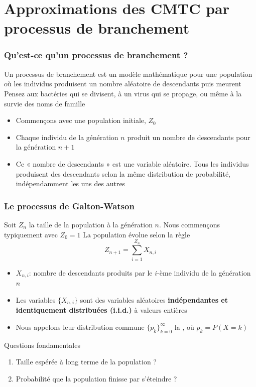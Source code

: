 \documentclass[aspectratio=169]{beamer}\usepackage[]{graphicx}\usepackage[]{xcolor}
\begin{document}
\section{Approximations des CMTC par processus de branchement}

\begin{frame}
    \frametitle{Qu'est-ce qu'un processus de branchement ?}
        Un processus de branchement est un modèle mathématique pour une population où les individus produisent un nombre aléatoire de descendants puis meurent
\vfill
Pensez aux bactéries qui se divisent, à un virus qui se propage, ou même à la survie des noms de famille
\vfill
    \begin{itemize}
        \item Commençons avec une population initiale, $Z_0$
        \item Chaque individu de la génération $n$ produit un nombre de descendants pour la génération $n+1$
        \item Ce « nombre de descendants » est une variable aléatoire. Tous les individus produisent des descendants selon la même distribution de probabilité, indépendamment les uns des autres
    \end{itemize}
\end{frame}

\begin{frame}
    \frametitle{Le processus de Galton-Watson}
    Soit $Z_n$ la taille de la population à la génération $n$. Nous commençons typiquement avec $Z_0 = 1$
\vfill
    La population évolue selon la règle
    $$ Z_{n+1} = \sum_{i=1}^{Z_n} X_{n,i} $$
\vfill
    \begin{itemize}
        \item $X_{n,i}$: nombre de descendants produits par le $i$-ème individu de la génération $n$
        \item Les variables $\{X_{n,i}\}$ sont des variables aléatoires \textbf{indépendantes et identiquement distribuées (i.i.d.)} à valeurs entières
        \item Nous appelons leur distribution commune $\{p_k\}_{k=0}^\infty$ la , où $p_k = P(X = k)$
    \end{itemize}

    \begin{alertblock}{Questions fondamentales}
    \begin{enumerate}
        \item Taille espérée à long terme de la population ?
        \item Probabilité que la population finisse par s'éteindre ?
    \end{enumerate}
    \end{alertblock}
\end{frame}
\end{document}
